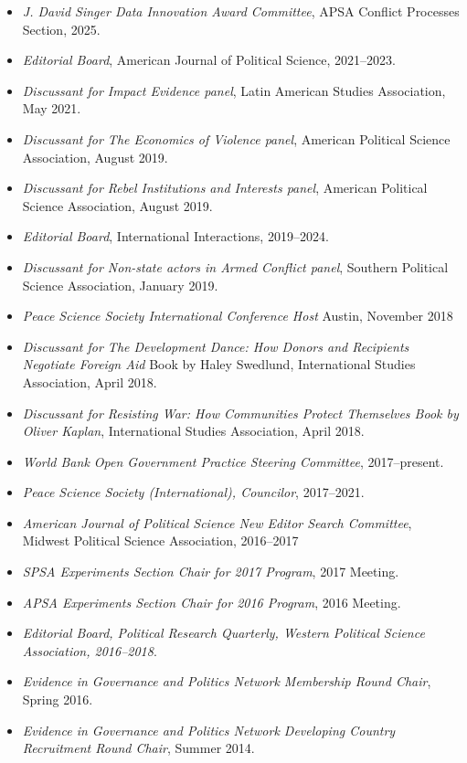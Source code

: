 \documentclass[10pt]{article}
\begin{document}
\begin{itemize}\setlength{\itemsep}{1pt}
\item \textit{J. David Singer Data Innovation Award Committee}, APSA Conflict Processes Section, 2025.
\item \textit{Editorial Board}, American Journal of Political Science, 2021--2023.
\item \textit{Discussant for Impact Evidence panel}, Latin American Studies Association, May 2021.
\item \textit{Discussant for The Economics of Violence panel}, American Political Science Association, August 2019.
\item \textit{Discussant for Rebel Institutions and Interests panel}, American Political Science Association, August 2019.
\item \textit{Editorial Board}, International Interactions, 2019--2024.
\item \textit{Discussant for Non-state actors in Armed Conflict panel}, Southern Political Science Association, January 2019.
\item \textit{Peace Science Society International Conference Host} Austin, November 2018
\item \textit{Discussant for The Development Dance: How Donors and Recipients Negotiate Foreign Aid} Book by Haley Swedlund, International Studies Association, April 2018.
\item \textit{Discussant for Resisting War: How Communities Protect Themselves Book by Oliver Kaplan}, International Studies Association, April 2018.
\item \textit{World Bank Open Government Practice Steering Committee}, 2017--present.
\item \textit{Peace Science Society (International), Councilor}, 2017--2021.
\item \textit{American Journal of Political Science New Editor Search Committee}, Midwest Political Science Association, 2016--2017
\item \textit{SPSA Experiments Section Chair for 2017 Program}, 2017 Meeting.
\item \textit{APSA Experiments Section Chair for 2016 Program}, 2016 Meeting.
\item \textit{Editorial Board, \textit{Political Research Quarterly}, Western Political Science Association, 2016--2018}.
\item \textit{Evidence in Governance and Politics Network Membership Round Chair}, Spring 2016.
\item \textit{Evidence in Governance and Politics Network Developing Country Recruitment Round Chair}, Summer 2014.

\end{itemize}
\end{document}
